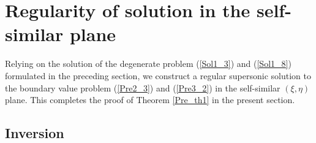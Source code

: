 \documentclass[3p,11pt]{elsarticle}
\numberwithin{equation}{section}
\begin{document}

\section{Regularity of solution in the self-similar plane}
Relying on the solution of the degenerate problem (\ref{Sol1_3}) and (\ref{Sol1_8}) formulated in the preceding section, we construct a regular supersonic solution to the boundary value problem (\ref{Pre2_3}) and (\ref{Pre3_2}) in the self-similar $(\xi,\eta)$ plane. This completes the proof of Theorem \ref{Pre_th1} in the present section.
     
\subsection{Inversion}
\end{document}
